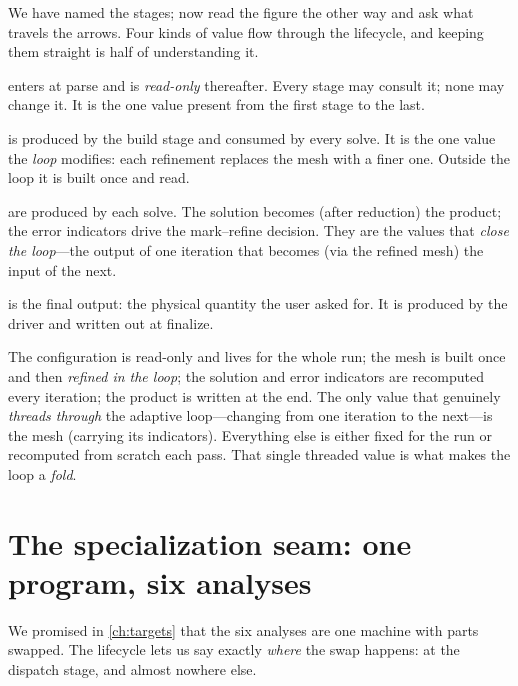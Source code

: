 We have named the stages; now read the figure the other way and ask what travels
the arrows. Four kinds of value flow through the lifecycle, and keeping them
straight is half of understanding it.

\begin{description}[style=nextline, leftmargin=0pt, font=\normalfont\itshape]
  \item[The configuration] enters at parse and is \emph{read-only} thereafter.
  Every stage may consult it; none may change it. It is the one value present
  from the first stage to the last.
  \item[The mesh] is produced by the build stage and consumed by every solve.
  It is the one value the \emph{loop} modifies: each refinement replaces the mesh
  with a finer one. Outside the loop it is built once and read.
  \item[The solution and its error indicators] are produced by each solve. The
  solution becomes (after reduction) the product; the error indicators drive the
  mark--refine decision. They are the values that \emph{close the loop}---the
  output of one iteration that becomes (via the refined mesh) the input of the
  next.
  \item[The product] is the final output: the physical quantity the user asked
  for. It is produced by the driver and written out at finalize.
\end{description}

\begin{keyidea}
The configuration is read-only and lives for the whole run; the mesh is built
once and then \emph{refined in the loop}; the solution and error indicators are
recomputed every iteration; the product is written at the end. The only value
that genuinely \emph{threads through} the adaptive loop---changing from one
iteration to the next---is the mesh (carrying its indicators). Everything else is
either fixed for the run or recomputed from scratch each pass. That single
threaded value is what makes the loop a \emph{fold}.
\end{keyidea}

\section{The specialization seam: one program, six analyses}
\label{sec:seam}

We promised in \cref{ch:targets} that the six analyses are one machine with parts
swapped. The lifecycle lets us say exactly \emph{where} the swap happens: at the
dispatch stage, and almost nowhere else.

